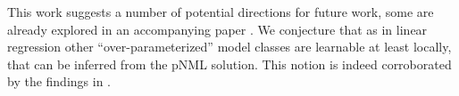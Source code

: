 \documentclass[conference,letterpaper]{IEEEtran}
\begin{document}
This work suggests a number of potential directions for future work, some are already explored in an accompanying paper \cite{pNML_neural_networks}. 
We conjecture that as in linear regression other ``over-parameterized'' model classes are learnable at least locally, that can be inferred from the pNML solution. 
This notion is indeed corroborated by the findings in \cite{pNML_neural_networks}.






%
%




\end{document}
